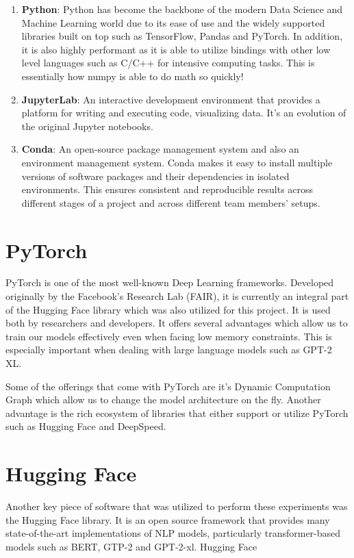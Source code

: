 \documentclass[\main/thesis.tex]{subfiles}
\begin{document}
\begin{enumerate}
    \item \textbf{Python}: Python has become the backbone of the modern Data Science and Machine Learning 
    world due to its ease of use and the widely supported libraries built on top such as TensorFlow, Pandas and PyTorch. 
    In addition, it is also highly performant as it is able to utilize bindings with other low level languages
    such as C/C++ for intensive computing tasks. This is essentially how numpy is able to do math so quickly! 
    
    \item \textbf{JupyterLab}: An interactive development environment that provides a platform for writing 
    and executing code, visualizing data. It's an evolution of the original Jupyter notebooks. 
    
    \item \textbf{Conda}: An open-source package management system and also an environment 
    management system. Conda makes it easy to install multiple versions of software packages 
    and their dependencies in isolated environments. This ensures consistent and reproducible 
    results across different stages of a project and across different team members' setups.
\end{enumerate}


\section{PyTorch}\label{sec:PyTorch}
PyTorch\cite{paszke_PyTorch_2019} is one of the most well-known Deep Learning frameworks. Developed originally by the Facebook's Research Lab (FAIR), 
it is currently an integral part of the Hugging Face library which was also utilized for this project. It is used both by
researchers and developers. It offers several advantages which allow us to train our models effectively even when 
facing low memory constraints. This is especially important when dealing with large language models such as GPT-2 XL. 

Some of the offerings that come with PyTorch are it's Dynamic Computation Graph which allow us to change the model architecture 
on the fly. Another advantage is the rich ecosystem of libraries that either support or utilize PyTorch such as 
Hugging Face and DeepSpeed. 

\section{Hugging Face}\label{sec:Hugging Face}
Another key piece of software that was utilized to perform these experiments was 
the Hugging Face\cite{wolf_transformers_2020} library. It is 
an open source framework that provides many state-of-the-art implementations of NLP models, particularly transformer-based models such as BERT, GTP-2 
and GPT-2-xl. Hugging Face 
\end{document}
